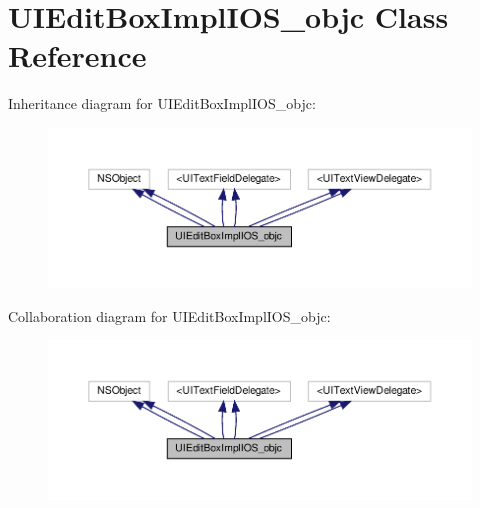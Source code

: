 \hypertarget{interfaceUIEditBoxImplIOS__objc}{}\section{U\+I\+Edit\+Box\+Impl\+I\+O\+S\+\_\+objc Class Reference}
\label{interfaceUIEditBoxImplIOS__objc}


Inheritance diagram for U\+I\+Edit\+Box\+Impl\+I\+O\+S\+\_\+objc\+:
\nopagebreak
\begin{figure}[H]
\begin{center}
\leavevmode
\includegraphics[width=350pt]{interfaceUIEditBoxImplIOS__objc__inherit__graph}
\end{center}
\end{figure}


Collaboration diagram for U\+I\+Edit\+Box\+Impl\+I\+O\+S\+\_\+objc\+:
\nopagebreak
\begin{figure}[H]
\begin{center}
\leavevmode
\includegraphics[width=350pt]{interfaceUIEditBoxImplIOS__objc__coll__graph}
\end{center}
\end{figure}
